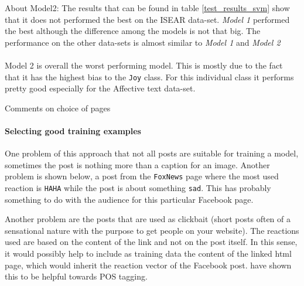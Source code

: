 \documentclass[11pt]{article}
\begin{document}


About Model2: The results that can be found in table \ref{test_results_svm} show that it does not performed the best on the ISEAR data-set. \textit{Model 1}  performed the best although the difference among the models is not that big. The performance on the other data-sets is almost similar to  \textit{Model 1} and \textit{Model 2}\\\\
Model 2 is overall the worst performing model. This is mostly due to the fact that it has the highest bias to the \texttt{Joy} class. For this individual class it performs pretty good especially for the Affective text data-set.


Comments on choice of pages
\paragraph{Selecting good training examples}
One problem of this approach that not all posts are suitable for training a model, sometimes the post is nothing more than a caption for an image. Another problem is shown below, a post from the \texttt{FoxNews} page where the most used reaction is \texttt{HAHA} while the post is about something \texttt{sad}. This has probably something to do with the audience for this particular Facebook page.


Another problem are the posts that are used as clickbait (short posts often of a sensational nature with the purpose to get people on your website). The reactions used are based on the content of the link and not on the post itself. In this sense, it would possibly help to include as training data the content of the linked html page, which would inherit the reaction vector of the Facebook post. \cite{barabra} have shown this to be helpful towards POS tagging.
\end{document}
